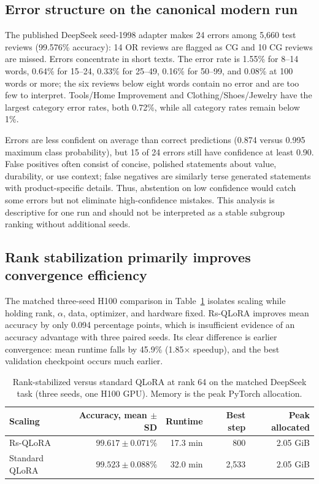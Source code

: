 \documentclass[utf8]{FrontiersinHarvard}
\begin{document}
\subsection{Error structure on the canonical modern run}

The published DeepSeek seed-1998 adapter makes 24 errors among 5,660 test reviews (99.576\% accuracy): 14 OR reviews are flagged as CG and 10 CG reviews are missed. Errors concentrate in short texts. The error rate is 1.55\% for 8--14 words, 0.64\% for 15--24, 0.33\% for 25--49, 0.16\% for 50--99, and 0.08\% at 100 words or more; the six reviews below eight words contain no error and are too few to interpret. Tools/Home Improvement and Clothing/Shoes/Jewelry have the largest category error rates, both 0.72\%, while all category rates remain below 1\%.

Errors are less confident on average than correct predictions (0.874 versus 0.995 maximum class probability), but 15 of 24 errors still have confidence at least 0.90. False positives often consist of concise, polished statements about value, durability, or use context; false negatives are similarly terse generated statements with product-specific details. Thus, abstention on low confidence would catch some errors but not eliminate high-confidence mistakes. This analysis is descriptive for one run and should not be interpreted as a stable subgroup ranking without additional seeds.

\subsection{Rank stabilization primarily improves convergence efficiency}

The matched three-seed H100 comparison in Table~\ref{tab:efficiency} isolates scaling while holding rank, $\alpha$, data, optimizer, and hardware fixed. Rs-QLoRA improves mean accuracy by only 0.094 percentage points, which is insufficient evidence of an accuracy advantage with three paired seeds. Its clear difference is earlier convergence: mean runtime falls by 45.9\% (1.85$\times$ speedup), and the best validation checkpoint occurs much earlier.

\begin{table}[h!]
\centering
\caption{Rank-stabilized versus standard QLoRA at rank 64 on the matched DeepSeek task (three seeds, one H100 GPU). Memory is the peak PyTorch allocation.}
\label{tab:efficiency}
\begin{tabular}{lrrrr}
\toprule
Scaling & Accuracy, mean $\pm$ SD & Runtime & Best step & Peak allocated \\
\midrule
Rs-QLoRA & $99.617 \pm 0.071$\% & 17.3 min & 800 & 2.05 GiB \\
Standard QLoRA & $99.523 \pm 0.088$\% & 32.0 min & 2,533 & 2.05 GiB \\
\bottomrule
\end{tabular}
\end{table}
\end{document}
